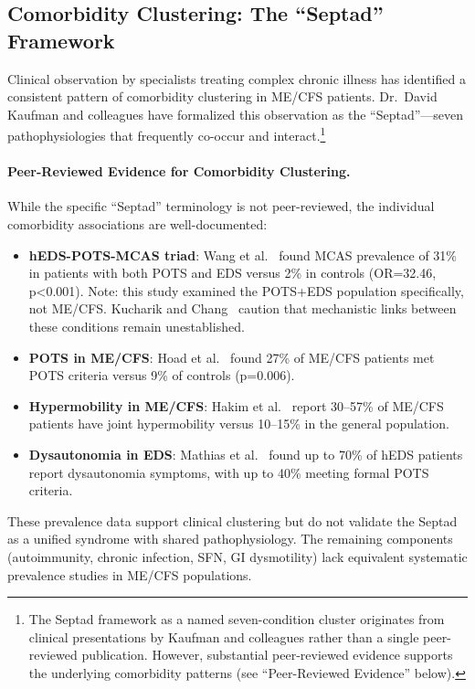 \subsection{Comorbidity Clustering: The ``Septad'' Framework}
\label{sec:septad}

Clinical observation by specialists treating complex chronic illness has identified a consistent pattern of comorbidity clustering in ME/CFS patients. Dr.\ David Kaufman and colleagues have formalized this observation as the ``Septad''---seven pathophysiologies that frequently co-occur and interact.\footnote{The Septad framework as a named seven-condition cluster originates from clinical presentations by Kaufman and colleagues rather than a single peer-reviewed publication. However, substantial peer-reviewed evidence supports the underlying comorbidity patterns (see ``Peer-Reviewed Evidence'' below).}

\paragraph{Peer-Reviewed Evidence for Comorbidity Clustering.}
While the specific ``Septad'' terminology is not peer-reviewed, the individual comorbidity associations are well-documented:

\begin{itemize}
    \item \textbf{hEDS-POTS-MCAS triad}: Wang et al.~\cite{Wang2021triad} found MCAS prevalence of 31\% in patients with both POTS and EDS versus 2\% in controls (OR=32.46, p<0.001). Note: this study examined the POTS+EDS population specifically, not ME/CFS. Kucharik and Chang~\cite{Kucharik2020} caution that mechanistic links between these conditions remain unestablished.
    \item \textbf{POTS in ME/CFS}: Hoad et al.~\cite{Hoad2008pots} found 27\% of ME/CFS patients met POTS criteria versus 9\% of controls (p=0.006).
    \item \textbf{Hypermobility in ME/CFS}: Hakim et al.~\cite{Hakim2017fatigue} report 30--57\% of ME/CFS patients have joint hypermobility versus 10--15\% in the general population.
    \item \textbf{Dysautonomia in EDS}: Mathias et al.~\cite{Mathias2021dysautonomia} found up to 70\% of hEDS patients report dysautonomia symptoms, with up to 40\% meeting formal POTS criteria.
\end{itemize}

These prevalence data support clinical clustering but do not validate the Septad as a unified syndrome with shared pathophysiology. The remaining components (autoimmunity, chronic infection, SFN, GI dysmotility) lack equivalent systematic prevalence studies in ME/CFS populations.

